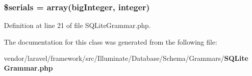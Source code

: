 \subsubsection[{\$serials}]{\setlength{\rightskip}{0pt plus 5cm}\$serials = array(\textquotesingle{}big\+Integer\textquotesingle{}, \textquotesingle{}integer\textquotesingle{})\hspace{0.3cm}{\ttfamily [protected]}}\label{class_illuminate_1_1_database_1_1_schema_1_1_grammars_1_1_s_q_lite_grammar_a151ecd4bab2e85de938891e925a040c2}


Definition at line 21 of file S\+Q\+Lite\+Grammar.\+php.



The documentation for this class was generated from the following file\+:\begin{DoxyCompactItemize}
\item 
vendor/laravel/framework/src/\+Illuminate/\+Database/\+Schema/\+Grammars/{\bf S\+Q\+Lite\+Grammar.\+php}\end{DoxyCompactItemize}
